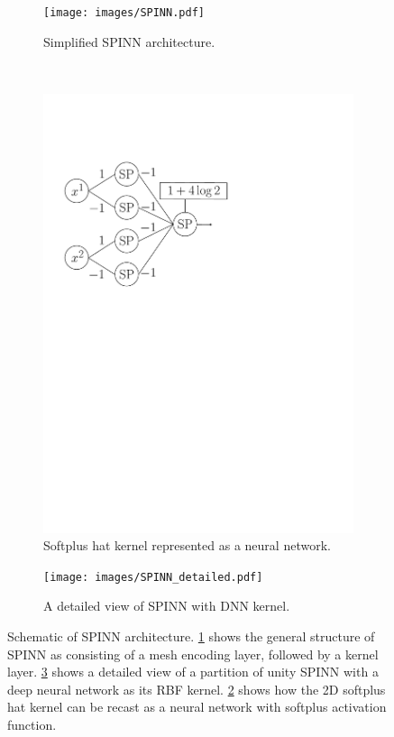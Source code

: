 \documentclass[12pt]{article}
\begin{document}
\begin{figure}[htpb]
\begin{subfigure}{0.6\textwidth}
\centering
\texttt{[image: images/SPINN.pdf]}
\caption{Simplified SPINN architecture.}
\label{fig:meshless_nn_repr}
\end{subfigure}
~
\begin{subfigure}{0.4\textwidth}
\centering
\includegraphics[width=\textwidth]{images/softplus_hat_nn.pdf}
\caption{Softplus hat kernel represented as a neural network.}
\label{fig:softplus_hat_nn}
\end{subfigure}
\begin{center}
\begin{subfigure}{0.5\textwidth}
\centering
\texttt{[image: images/SPINN\_detailed.pdf]}
\caption{A detailed view of SPINN with DNN kernel.}
\label{fig:meshless_nn_detailed}
\end{subfigure}
\end{center}
\caption{Schematic of SPINN architecture. \ref{fig:meshless_nn_repr} shows the general structure of SPINN as consisting of a mesh encoding layer, followed by a kernel layer. \ref{fig:meshless_nn_detailed} shows a detailed view of a partition of unity SPINN with a deep neural network as its RBF kernel. \ref{fig:softplus_hat_nn} shows how the 2D softplus hat kernel can be recast as a neural network with softplus activation function.}
\label{fig:spinn_architecture}
\end{figure}
\end{document}
